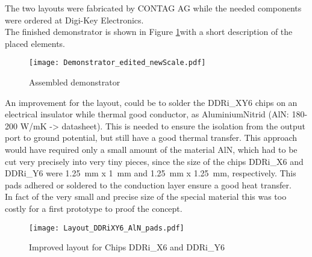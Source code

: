 

The two layouts were fabricated by CONTAG AG while the needed components were ordered at Digi-Key Electronics.\\
The finished demonstrator is shown in Figure \ref{fig:assembledDemonstrator}with a short description of the placed elements.

\begin{figure}[htb!]
	\centering
  \texttt{[image: Demonstrator\_edited\_newScale.pdf]}
	\caption{Assembled demonstrator}
	\label{fig:assembledDemonstrator}
\end{figure}


\newpage
An improvement for the layout, could be to solder the DDRi\_XY6 chips on an electrical insulator while thermal good conductor, as AluminiumNitrid (AlN: 180-200 W/mK -> datasheet). 
This is needed to ensure the isolation from the output port to ground potential, but still have a good thermal transfer.
This approach would have required only a small amount of the material AlN, which had to be cut very precisely into very tiny pieces, since the size of the chips DDRi\_X6 and DDRi\_Y6 were \SI{1.25}{\milli \meter} x \SI{1}{\milli \meter} and \SI{1.25}{\milli \meter} x \SI{1.25}{\milli \meter}, respectively.
This pads adhered or soldered to the conduction layer ensure a good heat transfer. \\
In fact of the very small and precise size of the special material this was too costly for a first prototype to proof the concept.


\begin{figure}[htb!]
	\centering
  \texttt{[image: Layout\_DDRiXY6\_AlN\_pads.pdf]}
	\caption{Improved layout for Chips DDRi\_X6 and DDRi\_Y6}
	\label{fig:DDRiXY6AlNpads}
\end{figure}